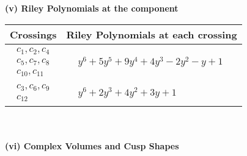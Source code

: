 \documentclass[1p]{elsarticle_modified}
\theoremstyle{definition}
\begin{document}
\newpage\renewcommand{\arraystretch}{1}
\flushleft \textbf{(v) Riley Polynomials at the component}\newline \\
\begin{tabular}{m{50pt}|m{274pt}}
Crossings & \hspace{64pt}Riley Polynomials at each crossing \\
\hline $$\begin{aligned}c_{1},c_{2},c_{4}\\c_{5},c_{7},c_{8}\\c_{10},c_{11}\end{aligned}$$&$\begin{aligned}
&y^6+5 y^5+9 y^4+4 y^3-2 y^2- y+1
\end{aligned}$\\
\hline $$\begin{aligned}c_{3},c_{6},c_{9}\\c_{12}\end{aligned}$$&$\begin{aligned}
&y^6+2 y^3+4 y^2+3 y+1
\end{aligned}$\\
\hline
\end{tabular}\\~\\
\newpage\flushleft \textbf{(vi) Complex Volumes and Cusp Shapes}
\end{document}
